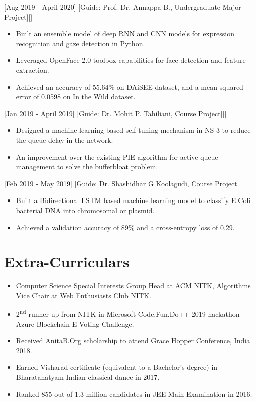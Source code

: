 \documentclass{article}
\begin{document}
[Aug 2019 - April 2020]
[Guide: Prof. Dr. Annappa B., Undergraduate Major Project][]
\begin{itemize}
\item Built an ensemble model of deep RNN and CNN models for expression recognition and gaze detection in Python.
\item Leveraged OpenFace 2.0 toolbox capabilities for face detection and feature extraction.
\item Achieved an accuracy of 55.64\% on DAiSEE dataset, and a mean squared error of 0.0598 on In the Wild dataset.
\end{itemize}

[Jan 2019 - April 2019]
[Guide: Dr. Mohit P. Tahiliani, Course Project][]
\begin{itemize}
\item Designed a machine learning based self-tuning mechanism in NS-3 to reduce the queue delay in the network. 
\item An improvement over the existing PIE algorithm for active queue management to solve the bufferbloat problem.
\end{itemize}

[Feb 2019 - May 2019]
[Guide: Dr. Shashidhar G Koolagudi, Course Project][]
\begin{itemize}
\item Built a Bidirectional LSTM based machine learning model to classify E.Coli bacterial DNA into chromosomal or plasmid.
\item Achieved a validation accuracy of 89\% and a cross-entropy loss of 0.29.
\end{itemize}

\section{Extra-Curriculars}
\begin{itemize}
\item Computer Science Special Interests Group Head at ACM NITK, Algorithms Vice Chair at Web Enthusiasts Club NITK.
\item 2\textsuperscript{nd} runner up from NITK in Microsoft Code.Fun.Do++ 2019 hackathon - Azure Blockchain E-Voting Challenge.
\item Received AnitaB.Org scholarship to attend Grace Hopper Conference, India 2018.
\item Earned Visharad certificate (equivalent to a Bachelor's degree) in Bharatanatyam Indian classical dance in 2017.
\item Ranked 855 out of 1.3 million candidates in JEE Main Examination in 2016.
\end{itemize}
\end{document}
